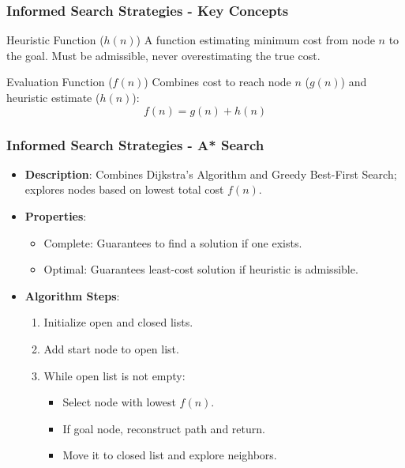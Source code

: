 \documentclass[aspectratio=169]{beamer}
\begin{document}
\begin{frame}[fragile]
    \frametitle{Informed Search Strategies - Key Concepts}
    \begin{block}{Heuristic Function ($h(n)$)}
        A function estimating minimum cost from node \( n \) to the goal. Must be admissible, never overestimating the true cost.
    \end{block}
    
    \begin{block}{Evaluation Function ($f(n)$)}
        Combines cost to reach node \( n \) (\( g(n) \)) and heuristic estimate (\( h(n) \)):
        \begin{equation}
            f(n) = g(n) + h(n)
        \end{equation}
    \end{block}
\end{frame}

\begin{frame}[fragile]
    \frametitle{Informed Search Strategies - A* Search}
    \begin{itemize}
        \item \textbf{Description}: Combines Dijkstra's Algorithm and Greedy Best-First Search; explores nodes based on lowest total cost \( f(n) \).
        
        \item \textbf{Properties}:
        \begin{itemize}
            \item Complete: Guarantees to find a solution if one exists.
            \item Optimal: Guarantees least-cost solution if heuristic is admissible.
        \end{itemize}
        
        \item \textbf{Algorithm Steps}:
        \begin{enumerate}
            \item Initialize open and closed lists.
            \item Add start node to open list.
            \item While open list is not empty:
            \begin{itemize}
                \item Select node with lowest \( f(n) \).
                \item If goal node, reconstruct path and return.
                \item Move it to closed list and explore neighbors.
            \end{itemize}
        \end{enumerate}
    \end{itemize}
\end{frame}
\end{document}
